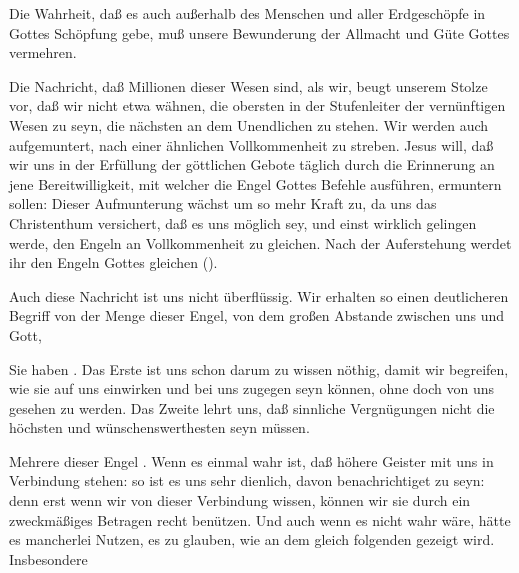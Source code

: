 \begin{aufza}
\item 
\begin{aufzb} \item Die Wahrheit, daß es auch außerhalb des Menschen und aller Erdgeschöpfe  in Gottes Schöpfung gebe, muß unsere Bewunderung der Allmacht und Güte Gottes vermehren.
\item Die Nachricht, daß Millionen dieser Wesen  sind, als wir, beugt unserem Stolze vor, daß wir nicht etwa wähnen, die obersten in der Stufenleiter der vernünftigen Wesen zu seyn, die nächsten an dem Unendlichen zu stehen. Wir werden auch aufgemuntert, nach einer ähnlichen Vollkommenheit zu streben. Jesus will, daß wir uns in der Erfüllung der göttlichen Gebote täglich durch die Erinnerung an jene Bereitwilligkeit, mit welcher die Engel Gottes Befehle ausführen, ermuntern sollen:  Dieser Aufmunterung wächst um so mehr Kraft zu, da uns das Christenthum versichert, daß es uns möglich sey, und einst wirklich gelingen werde, den Engeln an Vollkommenheit zu gleichen. Nach der Auferstehung werdet ihr den Engeln Gottes gleichen ().
\item {} Auch diese Nachricht ist uns nicht überflüssig. Wir erhalten so einen deutlicheren Begriff von der Menge dieser Engel, von dem großen Abstande zwischen uns und Gott, \usw\
\item Sie haben . Das Erste ist uns schon darum zu wissen nöthig, damit wir begreifen, wie sie auf uns einwirken und bei uns zugegen seyn können, ohne doch von uns gesehen zu werden. Das Zweite lehrt uns, daß sinnliche Vergnügungen nicht die höchsten und wünschenswerthesten seyn müssen.
\end{aufzb}
\item Mehrere dieser Engel . Wenn es einmal wahr ist, daß höhere Geister mit uns in Verbindung stehen: so ist es uns sehr dienlich, davon benachrichtiget zu seyn: denn erst wenn wir von dieser Verbindung wissen, können wir sie durch ein zweckmäßiges Betragen recht benützen. Und auch wenn es nicht wahr wäre, hätte es mancherlei Nutzen, es zu glauben, wie an dem gleich folgenden gezeigt wird. Insbesondere 
\begin{aufzb}

\end{aufzb}
\end{aufza}
